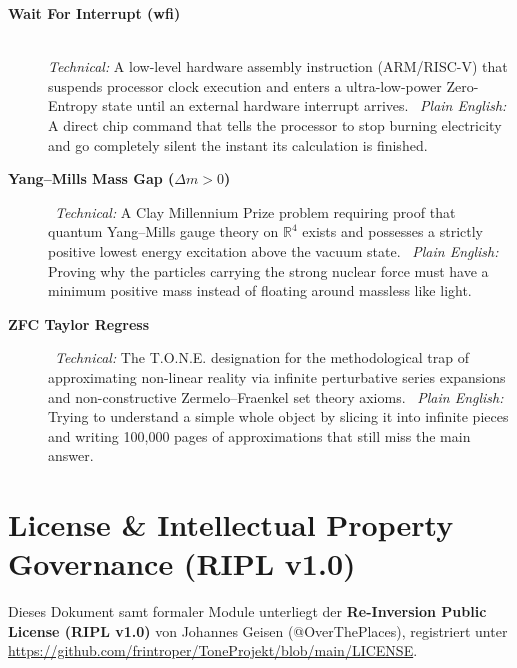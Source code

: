 \documentclass[11pt,a4paper,oneside]{article}
\def\texttt#1{#1}%
\theoremstyle{definition}
\begin{document}
\begin{description}
    \item[\textbf{Wait For Interrupt (\texttt{wfi})}] \hfill \\
\textit{Technical:} A low-level hardware assembly instruction (ARM/RISC-V) that suspends processor clock execution and enters a ultra-low-power Zero-Entropy state until an external hardware interrupt arrives. \
\textit{Plain English:} A direct chip command that tells the processor to stop burning electricity and go completely silent the instant its calculation is finished.
\item[\textbf{Yang–Mills Mass Gap ($\Delta m > 0$)}] \hfill \
\textit{Technical:} A Clay Millennium Prize problem requiring proof that quantum Yang–Mills gauge theory on $\mathbb{R}^4$ exists and possesses a strictly positive lowest energy excitation above the vacuum state. \
\textit{Plain English:} Proving why the particles carrying the strong nuclear force must have a minimum positive mass instead of floating around massless like light.
\item[\textbf{ZFC Taylor Regress}] \hfill \
\textit{Technical:} The T.O.N.E. designation for the methodological trap of approximating non-linear reality via infinite perturbative series expansions and non-constructive Zermelo–Fraenkel set theory axioms. \
\textit{Plain English:} Trying to understand a simple whole object by slicing it into infinite pieces and writing 100,000 pages of approximations that still miss the main answer.
\end{description}

\newpage
\section{License \& Intellectual Property Governance (RIPL v1.0)}

Dieses Dokument samt formaler Module unterliegt der \textbf{Re-Inversion Public License (RIPL v1.0)} von Johannes Geisen (\texttt{@OverThePlaces}), registriert unter \url{https://github.com/frintroper/ToneProjekt/blob/main/LICENSE}.
\end{document}
